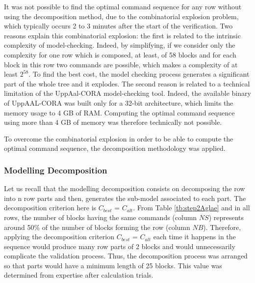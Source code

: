 \documentclass[preprint,3p,times,twocolumn]{elsarticle}
\begin{document}
It was not possible to find the optimal command sequence for any row without using the decomposition method, due to the combinatorial explosion problem, which typically occurs 2 to 3 minutes after the start of the verification. Two reasons explain this combinatorial explosion: the first is related to the intrinsic complexity of model-checking. Indeed, by simplifying, if we consider only the complexity for one row which is composed, at least, of 58 blocks and for each block in this row two commands are possible, which makes a complexity of at least $2^{58}$. To find the best cost, the model checking process generates a significant part of the whole tree and it explodes. The second reason is related to a technical limitation of the UppAal-CORA model-checking tool. Indeed, the available binary of UppAAL-CORA was built only for a 32-bit architecture, which limits the memory usage to 4 GB of RAM. Computing the optimal command sequence using more than 4 GB of memory was therefore technically not possible.

To overcome the combinatorial explosion in order to be able to compute the optimal command sequence, the decomposition methodology was applied. 
\subsubsection{Modelling Decomposition}

Let us recall that the modelling decomposition consists on decomposing the row into n row parts and then, generates the sub-model associated to each part. The decomposition criterion here is $C_{best}$ = $C_{alt}$. From Table \ref{tb:step2Aglae} and in all rows, the number of blocks having the same commands (column $NS$) represents around 50\% of the number of blocks forming the row (column $NB$). Therefore, applying the decomposition criterion $C_{best}$ = $C_{alt}$ each time it happens in the sequence would produce many row parts of 2 blocks and would unnecessarily complicate the validation process. Thus, the decomposition process was arranged so that parts would have a minimum length of 25 blocks. This value was determined from expertise after calculation trials.
\end{document}
